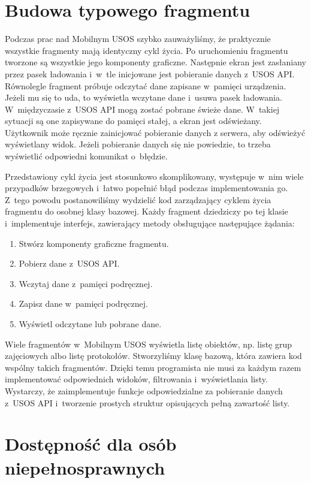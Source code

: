 \documentclass{pracamgr}
\begin{document}
\section{Budowa typowego fragmentu}

Podczas prac nad Mobilnym USOS szybko zauważyliśmy, że praktycznie wszystkie
fragmenty mają identyczny cykl życia. Po uruchomieniu fragmentu tworzone są
wszystkie jego komponenty graficzne. Następnie ekran jest zasłaniany przez pasek
ładowania i~w~tle inicjowane jest pobieranie danych z~USOS API. Równolegle fragment
próbuje odczytać dane zapisane w~pamięci urządzenia. Jeżeli mu się to uda, to
wyświetla wczytane dane i~usuwa pasek ładowania. W~międzyczasie z~USOS API mogą
zostać pobrane świeże dane. W~takiej sytuacji są one zapisywane do pamięci stałej,
a ekran jest odświeżany. Użytkownik może ręcznie zainicjować pobieranie danych z
serwera, aby odświeżyć wyświetlany widok. Jeżeli pobieranie danych się nie powiedzie,
to trzeba wyświetlić odpowiedni komunikat o~błędzie.

Przedstawiony cykl życia jest stosunkowo skomplikowany, występuje w~nim wiele
przypadków brzegowych i~łatwo popełnić błąd podczas implementowania go. Z~tego
powodu postanowiliśmy wydzielić kod zarządzający cyklem życia fragmentu do osobnej
klasy bazowej. Każdy fragment dziedziczy po tej klasie i~implementuje interfejs,
zawierający metody obsługujące następujące żądania:

\begin{enumerate}
	\item Stwórz komponenty graficzne fragmentu.
	\item Pobierz dane z~USOS API.
	\item Wczytaj dane z~pamięci podręcznej.
	\item Zapisz dane w~pamięci podręcznej.
	\item Wyświetl odczytane lub pobrane dane.
\end{enumerate}

Wiele fragmentów w~Mobilnym USOS wyświetla listę obiektów, np. listę grup zajęciowych
albo listę protokołów. Stworzyliśmy klasę bazową, która zawiera kod wspólny takich
fragmentów. Dzięki temu programista nie musi za każdym razem implementować odpowiednich
widoków, filtrowania i~wyświetlania listy. Wystarczy, że zaimplementuje funkcje
odpowiedzialne za pobieranie danych z~USOS API i~tworzenie prostych struktur
opisujących pełną zawartość listy.

\section{Dostępność dla osób niepełnosprawnych}
\end{document}
